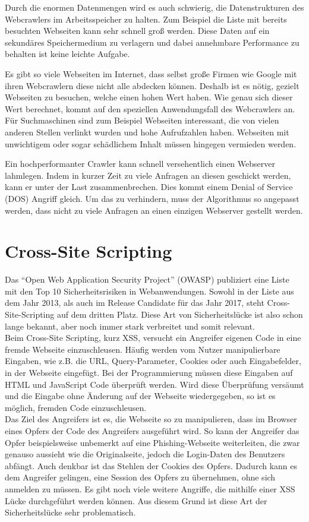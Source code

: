 Durch die enormen Datenmengen wird es auch schwierig, die Datenstrukturen des Webcrawlers im Arbeitsspeicher zu halten. Zum Beispiel die Liste mit bereits besuchten Webseiten kann sehr schnell groß werden. Diese Daten auf ein sekundäres Speichermedium zu verlagern und dabei annehmbare Performance zu behalten ist keine leichte Aufgabe. 

Es gibt so viele Webseiten im Internet, dass selbst große Firmen wie Google mit ihren Webcrawlern diese nicht alle abdecken können. Deshalb ist es nötig, gezielt Webseiten zu besuchen, welche einen hohen Wert haben. Wie genau sich dieser Wert berechnet, kommt auf den speziellen Anwendungsfall des Webcrawlers an. Für Suchmaschinen sind zum Beispiel Webseiten interessant, die von vielen anderen Stellen verlinkt wurden und hohe Aufrufzahlen haben. Webseiten mit unwichtigem oder sogar schädlichem Inhalt müssen hingegen vermieden werden. 

Ein hochperformanter Crawler kann schnell versehentlich einen Webserver lahmlegen. Indem in kurzer Zeit zu viele Anfragen an diesen geschickt werden, kann er unter der Last zusammenbrechen. Dies kommt einem Denial of Service (DOS) Angriff gleich. Um das zu verhindern, muss der Algorithmus so angepasst werden, dass nicht zu viele Anfragen an einen einzigen Webserver gestellt werden.

\section{Cross-Site Scripting}
Das \enquote{Open Web Application Security Project} (OWASP) publiziert eine Liste mit den Top 10 Sicherheitsrisiken in Webanwendungen.\cite{OWASPTop10} Sowohl in der Liste aus dem Jahr 2013, als auch im Release Candidate für das Jahr 2017, steht Cross-Site-Scripting auf dem dritten Platz. Diese Art von Sicherheitslücke ist also schon lange bekannt, aber noch immer stark verbreitet und somit relevant. \\
Beim Cross-Site Scripting, kurz XSS, versucht ein Angreifer eigenen Code in eine fremde Webseite einzuschleusen. Häufig werden vom Nutzer manipulierbare Eingaben, wie z.B. die URL, Query-Parameter, Cookies oder auch Eingabefelder, in der Webseite eingefügt. Bei der Programmierung müssen diese Eingaben auf HTML und JavaScript Code überprüft werden. Wird diese Überprüfung versäumt und die Eingabe ohne Änderung auf der Webseite wiedergegeben, so ist es möglich, fremden Code einzuschleusen. \cite{XSSErklaerung} \\
Das Ziel des Angreifers ist es, die Webseite so zu manipulieren, dass im Browser eines Opfers der Code des Angreifers ausgeführt wird. So kann der Angreifer das Opfer beispielsweise unbemerkt auf eine Phishing-Webseite weiterleiten, die zwar genauso aussieht wie die Originalseite, jedoch die Login-Daten des Benutzers abfängt. Auch denkbar ist das Stehlen der Cookies des Opfers. Dadurch kann es dem Angreifer gelingen, eine Session des Opfers zu übernehmen, ohne sich anmelden zu müssen. \cite{SessionHijacking} Es gibt noch viele weitere Angriffe, die mithilfe einer XSS Lücke durchgeführt werden können. Aus diesem Grund ist diese Art der Sicherheitslücke sehr problematisch.
